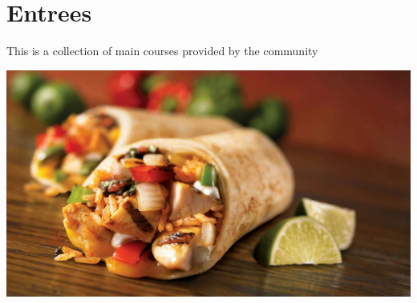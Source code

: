 \pagebreak
\chapter{Entrees}

This is a collection of main courses provided by the community

\centering
\includegraphics[scale=0.25]{images/pexels-photo-461198.jpg}
